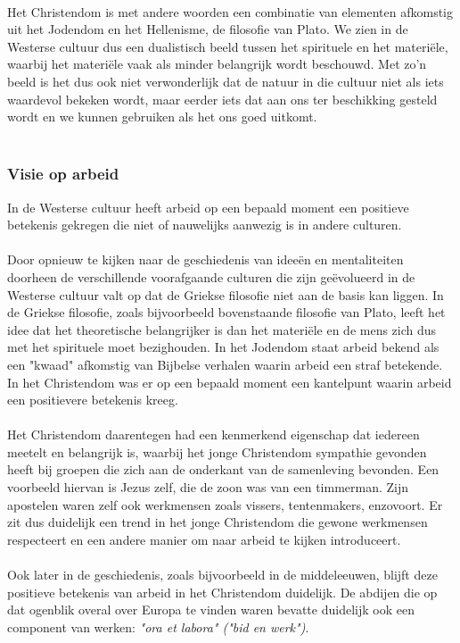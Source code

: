 \documentclass[../summary.tex]{subfiles}
\begin{document}
	\\
	Het Christendom is met andere woorden een combinatie van elementen afkomstig uit het Jodendom en het Hellenisme, de filosofie van Plato. We zien in de Westerse cultuur dus een dualistisch beeld tussen het spirituele en het materiële, waarbij het materiële vaak als minder belangrijk wordt beschouwd. Met zo'n beeld is het dus ook niet verwonderlijk dat de natuur in die cultuur niet als iets waardevol bekeken wordt, maar eerder iets dat aan ons ter beschikking gesteld wordt en we kunnen gebruiken als het ons goed uitkomt.\\
	\\
	\subsubsection{Visie op arbeid}
	In de Westerse cultuur heeft arbeid op een bepaald moment een positieve betekenis gekregen die niet of nauwelijks aanwezig is in andere culturen.\\
	\\
	Door opnieuw te kijken naar de geschiedenis van ideeën en mentaliteiten doorheen de verschillende voorafgaande culturen die zijn geëvolueerd in de Westerse cultuur valt op dat de Griekse filosofie niet aan de basis kan liggen. In de Griekse filosofie, zoals bijvoorbeeld bovenstaande filosofie van Plato, leeft het idee dat het theoretische belangrijker is dan het materiële en de mens zich dus met het spirituele moet bezighouden. In het Jodendom staat arbeid bekend als een "kwaad" afkomstig van Bijbelse verhalen waarin arbeid een straf betekende. In het Christendom was er op een bepaald moment een kantelpunt waarin arbeid een positievere betekenis kreeg. \\
	\\
	Het Christendom daarentegen had een kenmerkend eigenschap dat iedereen meetelt en belangrijk is, waarbij het jonge Christendom sympathie gevonden heeft bij groepen die zich aan de onderkant van de samenleving bevonden. Een voorbeeld hiervan is Jezus zelf, die de zoon was van een timmerman. Zijn apostelen waren zelf ook werkmensen zoals vissers, tentenmakers, enzovoort. Er zit dus duidelijk een trend in het jonge Christendom die gewone werkmensen respecteert en een andere manier om naar arbeid te kijken introduceert.\\
	\\
	Ook later in de geschiedenis, zoals bijvoorbeeld in de middeleeuwen, blijft deze positieve betekenis van arbeid in het Christendom duidelijk. De abdijen die op dat ogenblik overal over Europa te vinden waren bevatte duidelijk ook een component van werken: \textit{"ora et labora" ("bid en werk")}. \\
	\\
	
	
	
	
\end{document}
